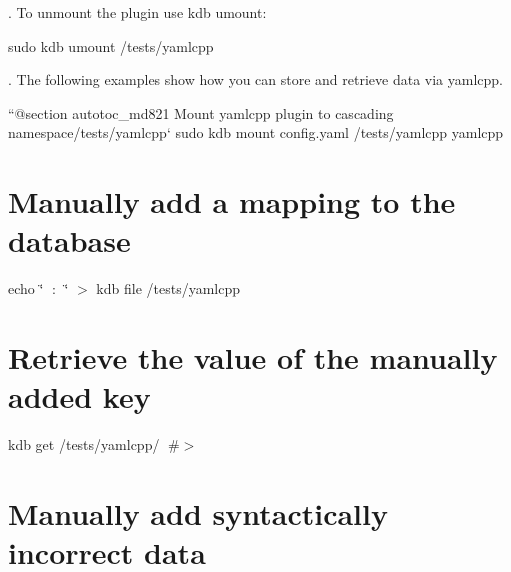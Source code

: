 . To unmount the plugin use {\ttfamily kdb umount}\+:


\begin{DoxyCode}
sudo kdb umount /tests/yamlcpp
\end{DoxyCode}


. The following examples show how you can store and retrieve data via {\ttfamily yamlcpp}.

``{\ttfamily  @section autotoc\+\_\+md821 Mount yamlcpp plugin to cascading namespace}/tests/yamlcpp` sudo kdb mount config.\+yaml /tests/yamlcpp yamlcpp\hypertarget{autotoc_md817_autotoc_md822}{}\section{Manually add a mapping to the database}\label{autotoc_md817_autotoc_md822}
echo \char`\"{}🔑 \+: 🐳\char`\"{} $>$ {\ttfamily kdb file /tests/yamlcpp} \hypertarget{autotoc_md817_autotoc_md823}{}\section{Retrieve the value of the manually added key}\label{autotoc_md817_autotoc_md823}
kdb get /tests/yamlcpp/🔑 \#$>$ 🐳\hypertarget{autotoc_md817_autotoc_md824}{}\section{Manually add syntactically incorrect data}\label{autotoc_md817_autotoc_md824}
